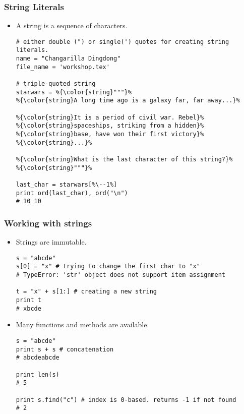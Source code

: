 \documentclass{beamer}
\begin{document}
\begin{frame}[fragile]
\frametitle{String Literals}
\begin{itemize}
\item A string is a sequence of characters.
\begin{lstlisting}[escapechar=\%]
# either double (") or single(') quotes for creating string literals.
name = "Changarilla Dingdong"
file_name = 'workshop.tex'

# triple-quoted string
starwars = %{\color{string}"""}%
%{\color{string}A long time ago is a galaxy far, far away...}%

%{\color{string}It is a period of civil war. Rebel}%
%{\color{string}spaceships, striking from a hidden}%
%{\color{string}base, have won their first victory}%
%{\color{string}...}%

%{\color{string}What is the last character of this string?}%
%{\color{string}"""}%

last_char = starwars[%\--1%]
print ord(last_char), ord("\n")
# 10 10
\end{lstlisting}
\end{itemize}
\end{frame}

\begin{frame}[fragile]
\frametitle{Working with strings}
\begin{itemize}
\item Strings are immutable.
\begin{lstlisting}
s = "abcde"
s[0] = "x" # trying to change the first char to "x"
# TypeError: 'str' object does not support item assignment

t = "x" + s[1:] # creating a new string
print t
# xbcde
\end{lstlisting} 
\item Many functions and methods are available. 
\begin{lstlisting}
s = "abcde"
print s + s # concatenation 
# abcdeabcde

print len(s)
# 5

print s.find("c") # index is 0-based. returns -1 if not found
# 2
\end{lstlisting} 
\end{itemize}
\end{frame}
\end{document}
